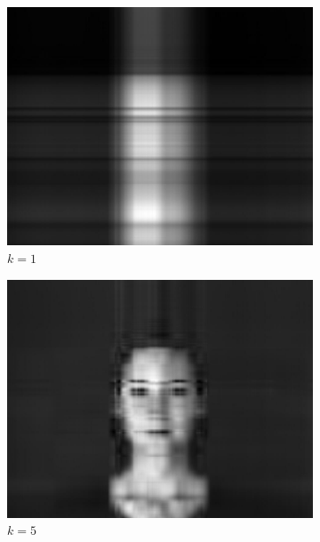 \documentclass[11pt,a4paper]{article}
\begin{document}
\begin{figure}[H]
  \centering
  \begin{subfigure}[t]{.5\textwidth}
    \centering
    \includegraphics[scale=0.15]{img/k1_woman}
    \caption{$k = 1$}
  \end{subfigure}%
  \begin{subfigure}[t]{.5\textwidth}
    \centering
    \includegraphics[scale=0.15]{img/k5_woman}
    \caption{$k = 5$}
  \end{subfigure}
  \begin{subfigure}[t]{.5\textwidth}
    \centering

\end{subfigure}
\end{figure}
\end{document}
